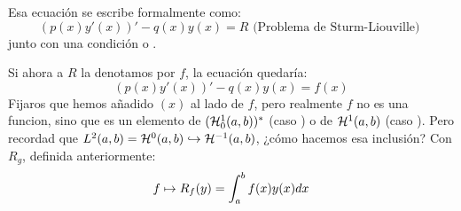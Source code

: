 Esa ecuación se escribe formalmente como:
\[
(p(x)y'(x))'-q(x)y(x)=R \text{ (Problema de Sturm-Liouville) }
\]
junto con una condición  o . 

Si ahora a $R$ la denotamos por $f$, la ecuación quedaría:
\begin{equation}
\label{problemaliouville2}
(p(x)y'(x))'-q(x)y(x)=f(x)
\end{equation}
Fijaros que hemos añadido $(x)$ al lado de $f$, pero realmente $f$ no es una funcion, sino que es un elemento de $(\mathcal{H}_0^{ 1 } (a,b))^*$ (caso ) o de $\mathcal{H}^{ 1 } (a,b)$ (caso ). Pero recordad que $L^{ 2 }(a,b)=\mathcal{H}^{ 0 } (a,b)\hookrightarrow\mathcal{H}^{ -1 } (a,b)$, ¿cómo hacemos esa inclusión? Con $R_g$, definida anteriormente:
\[
f\mapsto R_f(y)=\displaystyle\int_{ a }^{ b } f(x)y(x)dx
\]

